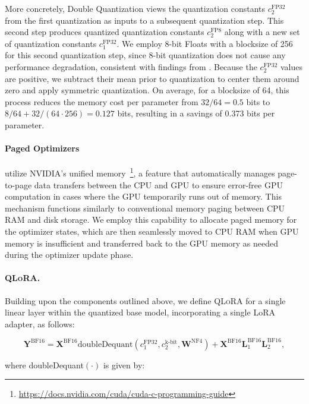More concretely, Double Quantization views the quantization constants $c_2^{\text{FP32}}$ from the first quantization as inputs to a subsequent quantization step. This second step produces quantized quantization constants $c_2^{\text{FP8}}$ along with a new set of quantization constants $c_1^{\text{FP32}}$. We employ 8-bit Floats with a blocksize of 256 for this second quantization step, since 8-bit quantization does not cause any performance degradation, consistent with findings from \citet{dettmers2022case}. Because the $c_2^{\text{FP32}}$ values are positive, we subtract their mean prior to quantization to center them around zero and apply symmetric quantization. On average, for a blocksize of 64, this process reduces the memory cost per parameter from $32/64 = 0.5$ bits to $8/64 + 32/(64 \cdot 256) = 0.127$ bits, resulting in a savings of 0.373 bits per parameter.

\paragraph{Paged Optimizers} utilize NVIDIA's unified memory~\footnote{\tiny \url{https://docs.nvidia.com/cuda/cuda-c-programming-guide}}, a feature that automatically manages page-to-page data transfers between the CPU and GPU to ensure error-free GPU computation in cases where the GPU temporarily runs out of memory. This mechanism functions similarly to conventional memory paging between CPU RAM and disk storage. We employ this capability to allocate paged memory for the optimizer states, which are then seamlessly moved to CPU RAM when GPU memory is insufficient and transferred back to the GPU memory as needed during the optimizer update phase.

\paragraph{\textsc{QLoRA}.} Building upon the components outlined above, we define \textsc{QLoRA} for a single linear layer within the quantized base model, incorporating a single LoRA adapter, as follows:

\begin{equation}
    \mathbf{Y}^{\text{BF16}} =  \mathbf{X}^{\text{BF16}} \text{doubleDequant}(c_1^{\text{FP32}}, c_2^{\text{k-bit}}, \mathbf{W}^{\text{NF4}}) + \mathbf{X}^{\text{BF16}}\mathbf{L}^{\text{BF16}}_1\mathbf{L}^{\text{BF16}}_2,
\end{equation}

where doubleDequant$(\cdot)$ is given by:


